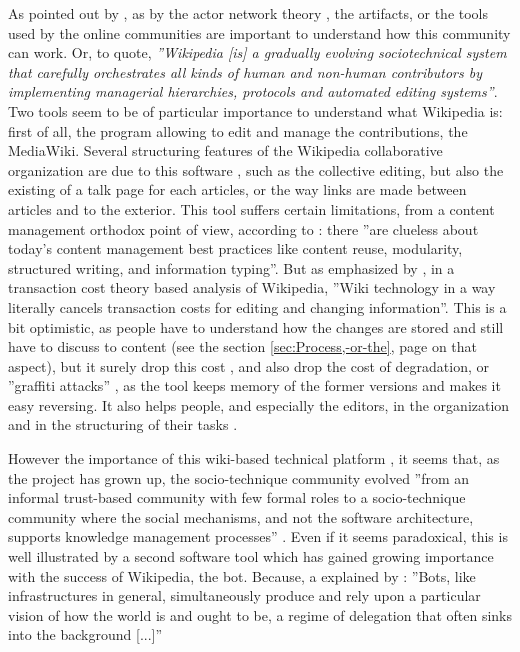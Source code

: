 As pointed out by \citet{HessOstrom06b}, as by the actor network
theory \citet{AkrichCallonLatour06,Latour05}, the artifacts, or the
tools used by the online communities are important to understand how
this community can work. Or, to quote\citet[p. 6]{NiederervanDijck10},
\textit{''Wikipedia {[}is{]} a gradually evolving sociotechnical
system that carefully orchestrates all kinds of human and non-human
contributors by implementing managerial hierarchies, protocols and
automated editing systems''}. Two tools seem to be of particular
importance to understand what Wikipedia is: first of all, the program
allowing to edit and manage the contributions, the MediaWiki. Several
structuring features of the Wikipedia collaborative organization are
due to this software \citep{PrasarnphanichWagner09}, such as the
collective editing, but also the existing of a talk page for each
articles, or the way links are made between articles and to the exterior.
This tool suffers certain limitations, from a content management orthodox
point of view, according to \citet{Doyle08}: there ''are clueless
about today\textquoteright s content management best practices like
content reuse, modularity, structured writing, and information typing''.
But as emphasized by \citet{Ciffolilli03}, in a transaction cost
theory based analysis of Wikipedia, ''Wiki technology in a way literally
cancels transaction costs for editing and changing information''.
This is a bit optimistic, as people have to understand how the changes
are stored and still have to discuss to content (see the section \ref{sec:Process,-or-the},
page \pageref{sec:Process,-or-the} on that aspect), but it surely
drop this cost \citep[p. 252]{RafaeliAriel08}, and also drop the
cost of degradation, or ''graffiti attacks'' \citep{Ciffolilli03},
as the tool keeps memory of the former versions and makes it easy
reversing. It also helps people, and especially the editors, in the
organization and in the structuring of their tasks \citep{Sundin11}.

However the importance of this wiki-based technical platform \citep{NiederervanDijck10},
it seems that, as the project has grown up, the socio-technique community
evolved ''from an informal trust-based community with few formal
roles to a socio-technique community where the social mechanisms,
and not the software architecture, supports knowledge management processes''
\citep{Jahnke10}. Even if it seems paradoxical, this is well illustrated
by a second software tool which has gained growing importance with
the success of Wikipedia, the bot. Because, a explained by \citet[end of p. 5 and following]{Geiger11}:
''Bots, like infrastructures in general, simultaneously produce and
rely upon a particular vision of how the world is and ought to be,
a regime of delegation that often sinks into the background {[}...{]}''

